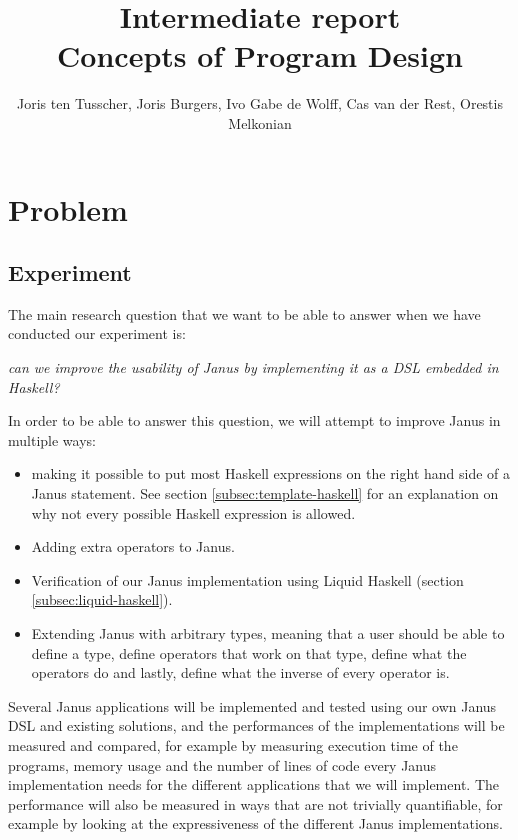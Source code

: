 \documentclass[12pt,a4paper]{article}
\title{\textbf{Intermediate report \\ \small{Concepts of Program Design}}}
\author{\small{Joris ten Tusscher, Joris Burgers, Ivo Gabe de Wolff, Cas van der Rest, Orestis Melkonian}}
\date{}
\begin{document}
\maketitle


\section{Problem}
	\subsection{Experiment}
	The main research question that we want to be able to answer when we have conducted our experiment is:
	
	\begin{displayquote}
	\textit{can we improve the usability of Janus by implementing it as a DSL embedded in Haskell?}
	\end{displayquote}
	
	\noindent In order to be able to answer this question, we will attempt to improve Janus in multiple ways:
	\begin{itemize}
		\item making it possible to put most Haskell expressions on the right hand side of a Janus statement. See section \ref{subsec:template-haskell} for an explanation on why not every possible Haskell expression is allowed.
		\item Adding extra operators to Janus.
		\item Verification of our Janus implementation using Liquid Haskell (section \ref{subsec:liquid-haskell}).
		\item Extending Janus with arbitrary types, meaning that a user should be able to define a type, define operators that work on that type, define what the operators do and lastly, define what the inverse of every operator is.
	\end{itemize}
	Several Janus applications will be implemented and tested using our own Janus DSL and existing solutions, and the performances of the implementations will be measured and compared, for example by measuring execution time of the programs, memory usage and the number of lines of code every Janus implementation needs for the different applications that we will implement. The performance will also be measured in ways that are not trivially quantifiable, for example by looking at the expressiveness of the different Janus implementations.
	
\end{document}
